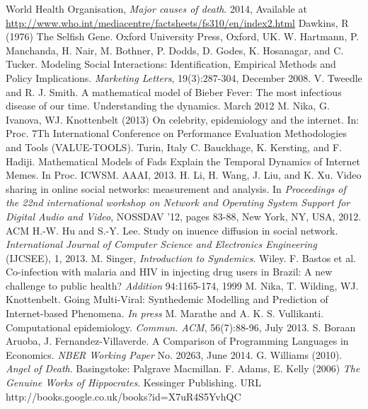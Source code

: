 \documentclass[11pt, a4paper, oneside,titlepage]{article}
\begin{document}
\begin{thebibliography}{1}
		World Health Organisation,
		\emph{Major causes of death}.
		2014,
		Available at \url{http://www.who.int/mediacentre/factsheets/fs310/en/index2.html}
		Dawkins, R (1976) The Selfish Gene. Oxford University Press, Oxford, UK.
		W. Hartmann, P. Manchanda, H. Nair, M. Bothner, P. Dodds, D. Godes, K. Hosanagar, and C. Tucker. Modeling Social Interactions: Identification, Empirical Methods and Policy Implications. \emph{Marketing Letters}, 19(3):287-304, December 2008.
		V. Tweedle and R. J. Smith. A mathematical model of Bieber Fever: The most infectious disease of our time. Understanding the dynamics. March 2012
		M. Nika, G. Ivanova, WJ. Knottenbelt (2013) On celebrity, epidemiology and the internet. In: Proc. 7Th International Conference on Performance Evaluation Methodologies and Tools (VALUE-TOOLS). Turin, Italy
		C. Bauckhage, K. Kersting, and F. Hadiji. Mathematical Models of Fads Explain the Temporal Dynamics of Internet Memes. In Proc. ICWSM. AAAI, 2013.
	H. Li, H. Wang, J. Liu, and K. Xu. Video sharing in online social networks: measurement and analysis. In \emph{Proceedings of the 22nd international workshop on Network and Operating System Support for Digital Audio and Video}, NOSSDAV '12, pages 83-88, New York, NY, USA, 2012. ACM
		H.-W. Hu and S.-Y. Lee. Study on inuence diffusion in social network. \emph{International Journal of Computer Science and Electronics Engineering} (IJCSEE), 1, 2013.
		M. Singer, \emph{Introduction to Syndemics}. Wiley.
		F. Bastos et al. Co-infection with malaria and HIV in injecting drug users in Brazil: A new challenge to public health? \emph{Addition} 94:1165-174, 1999
	M. Nika, T. Wilding, WJ. Knottenbelt. Going Multi-Viral: Synthedemic Modelling and Prediction of Internet-based Phenomena. \emph{In press}
	M. Marathe and A. K. S. Vullikanti. Computational
        epidemiology. \emph{Commun. ACM}, 56(7):88-96, July 2013.
         S. Boraan Aruoba,
          J. Fernandez-Villaverde. A Comparison of Programming
          Languages in Economics. \emph{NBER Working Paper} No. 20263,
          June 2014.
	G. Williams (2010). \emph{Angel of Death}. Basingstoke: Palgrave Macmillan.
	F. Adams, E. Kelly (2006) \emph{The Genuine Works of Hippocrates}. Kessinger Publishing. URL http://books.google.co.uk/books?id=X7uR4S5YvhQC

\end{thebibliography}
\end{document}
